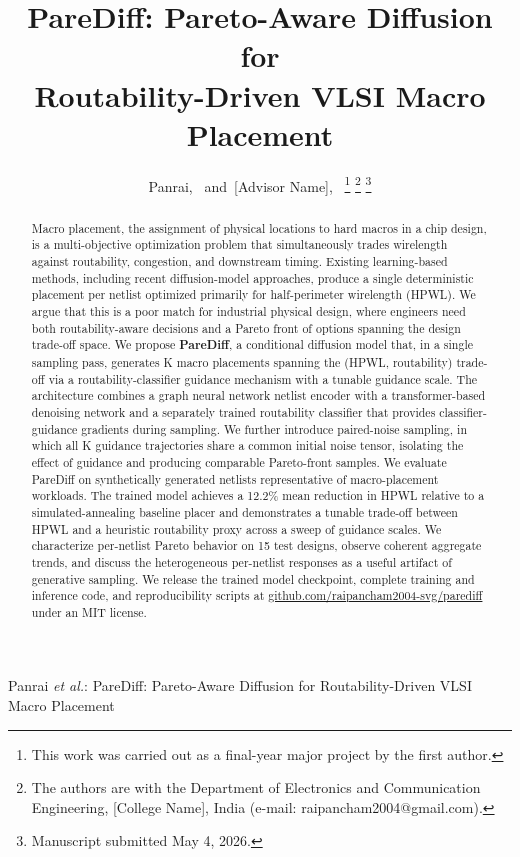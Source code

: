 \documentclass[lettersize,journal]{IEEEtran}
\begin{document}
\title{PareDiff: Pareto-Aware Diffusion for\\ Routability-Driven VLSI Macro Placement}

\author{Panrai,~
        and~[Advisor Name],~
\thanks{This work was carried out as a final-year major project by the first author.}%
\thanks{The authors are with the Department of Electronics and Communication Engineering, [College Name], India (e-mail: raipancham2004@gmail.com).}%
\thanks{Manuscript submitted May 4, 2026.}}

%
{Panrai \MakeLowercase{\textit{et al.}}: PareDiff: Pareto-Aware Diffusion for Routability-Driven VLSI Macro Placement}


\maketitle

\begin{abstract}
Macro placement, the assignment of physical locations to hard macros in a chip design, is a multi-objective optimization problem that simultaneously trades wirelength against routability, congestion, and downstream timing. Existing learning-based methods, including recent diffusion-model approaches, produce a single deterministic placement per netlist optimized primarily for half-perimeter wirelength (HPWL). We argue that this is a poor match for industrial physical design, where engineers need both routability-aware decisions and a Pareto front of options spanning the design trade-off space. We propose \textbf{PareDiff}, a conditional diffusion model that, in a single sampling pass, generates K macro placements spanning the (HPWL, routability) trade-off via a routability-classifier guidance mechanism with a tunable guidance scale. The architecture combines a graph neural network netlist encoder with a transformer-based denoising network and a separately trained routability classifier that provides classifier-guidance gradients during sampling. We further introduce paired-noise sampling, in which all K guidance trajectories share a common initial noise tensor, isolating the effect of guidance and producing comparable Pareto-front samples. We evaluate PareDiff on synthetically generated netlists representative of macro-placement workloads. The trained model achieves a 12.2\% mean reduction in HPWL relative to a simulated-annealing baseline placer and demonstrates a tunable trade-off between HPWL and a heuristic routability proxy across a sweep of guidance scales. We characterize per-netlist Pareto behavior on 15 test designs, observe coherent aggregate trends, and discuss the heterogeneous per-netlist responses as a useful artifact of generative sampling. We release the trained model checkpoint, complete training and inference code, and reproducibility scripts at \url{github.com/raipancham2004-svg/parediff} under an MIT license.
\end{abstract}
\end{document}
